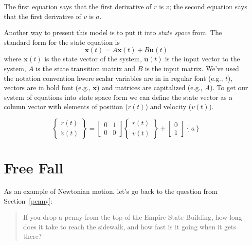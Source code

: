 The first equation says that the first derivative of $r$ is $v$;
the second equation says that the first derivative of $v$ is $a$.

Another way to present this model is to put it into \emph{state space} from.  The standard form for the state equation is
\begin{equation}
    \dot{\mathbf{x}}(t) = A \mathbf{x}(t) + B \mathbf{u}(t) 
\end{equation}
where $\mathbf{x}(t)$ is the state vector of the system, $\mathbf{u}(t)$ is the input vector to the system, $A$ is the state transition matrix and $B$ is the input matrix.  We've used the notation convention hwere scalar variables are in in regular font (e.g., $t$), vectors are in bold font (e.g., $\mathbf{x}$) and matrices are capitalized (e.g., $A$).  To get our system of equations into state space form we can define the state vector as a column vector with elements of position ($r(t)$) and velocity ($v(t)$).

\begin{equation}
\left\lbrace
\begin{array}{c}
    \dot{r}(t) \\
    \dot{v}(t)
\end{array}
\right\rbrace
=
\left[ \begin{array}{cc}
0 & 1 \\
0 & 0 
\end{array} \right]
\left\{ \begin{array}{c}
    r(t) \\ v(t)
\end{array} \right\}
+ 
\left[ \begin{array}{c}
    0 \\ 1
\end{array} \right]
\left\{ a \right\}
\end{equation}

\section{Free Fall}
\label{freefall}

As an example of Newtonian motion, let's go back to the question from Section~\ref{penny}:

\begin{quote}
If you drop a penny from the top of the Empire State Building, how long does it take to reach the sidewalk, and how fast is it going when it gets there?
\end{quote}

